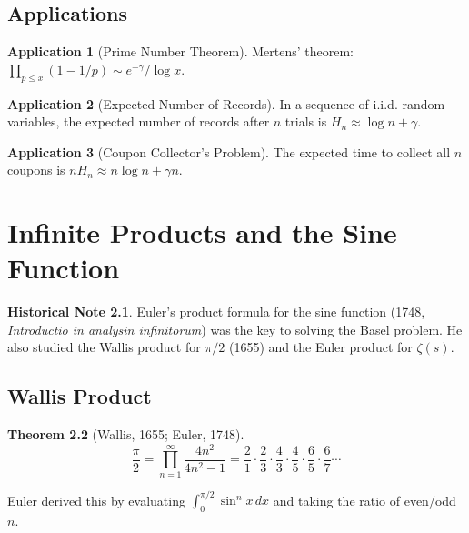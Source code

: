 \documentclass[11pt,a4paper,twoside]{book}
\theoremstyle{eulerstyle}
\newtheorem{theorem}{Theorem}[chapter]
\theoremstyle{definition}
\newtheorem{historical}[theorem]{Historical Note}
\newtheorem{application}[theorem]{Application}
\begin{document}
\section{Applications}

\begin{application}[Prime Number Theorem]
Mertens' theorem: $\prod_{p \le x} (1 - 1/p) \sim e^{-\gamma}/\log x$.
\end{application}

\begin{application}[Expected Number of Records]
In a sequence of i.i.d. random variables, the expected number of records after $n$ trials is $H_n \approx \log n + \gamma$.
\end{application}

\begin{application}[Coupon Collector's Problem]
The expected time to collect all $n$ coupons is $n H_n \approx n \log n + \gamma n$.
\end{application}

\cleardoublepage

\chapter{Infinite Products and the Sine Function}
\label{ch:products}

\begin{historical}
Euler's product formula for the sine function (1748, \emph{Introductio in analysin infinitorum}) was the key to solving the Basel problem. He also studied the Wallis product for $\pi/2$ (1655) and the Euler product for $\zeta(s)$. \cite{euler1748}\end{historical}

\section{Wallis Product}

\begin{theorem}[Wallis, 1655; Euler, 1748]
\[
\frac{\pi}{2} = \prod_{n=1}^\infty \frac{4n^2}{4n^2 - 1}
= \frac{2}{1} \cdot \frac{2}{3} \cdot \frac{4}{3} \cdot \frac{4}{5} \cdot \frac{6}{5} \cdot \frac{6}{7} \cdots
\]
\end{theorem}

Euler derived this by evaluating $\int_0^{\pi/2} \sin^n x\, dx$ and taking the ratio of even/odd $n$.
\end{document}
